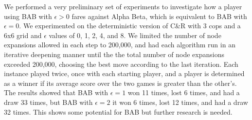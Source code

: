 \documentclass[runningheads]{llncs}
\begin{document}
 We performed a very preliminary set of experiments to investigate how a player using BAB with $\epsilon>0$ fares against Alpha Beta, which is equivalent to BAB with $\epsilon=0$. We experimented on the deterministic version of C\&R with 3 cops and a 6x6 grid and $\epsilon$ values of 0, 1, 2, 4, and 8. We limited the number of node expansions allowed in each step to 200,000, and had each algorithm run in an iterative deepening manner until the the total number of node expansions exceeded 200,000, choosing the  best move according to the last iteration. Each instance played twice, once with each starting player, and a player is determined as a winner if its average score over the two games is greater than the other's. The results showed that BAB with $\epsilon=1$ won 11 times, lost 6 times, and had a draw 33 times, but BAB with $\epsilon=2$ it won 6 times, lost 12 times, and had a draw 32 times. This shows some potential for BAB but further research is needed. 






\end{document}
